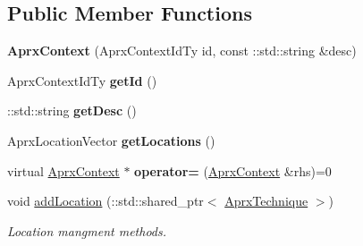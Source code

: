 \subsection*{Public Member Functions}
\begin{DoxyCompactItemize}
\item 
\hypertarget{classbellerophon_1_1core_1_1AprxContext_a1311e2eae37a05fbb1c3afa166773ff7}{}\label{classbellerophon_1_1core_1_1AprxContext_a1311e2eae37a05fbb1c3afa166773ff7} 
{\bfseries Aprx\+Context} (Aprx\+Context\+Id\+Ty id, const \+::std\+::string \&desc)
\item 
\hypertarget{classbellerophon_1_1core_1_1AprxContext_a6e7500fec23c749aa7bed069443df135}{}\label{classbellerophon_1_1core_1_1AprxContext_a6e7500fec23c749aa7bed069443df135} 
Aprx\+Context\+Id\+Ty {\bfseries get\+Id} ()
\item 
\hypertarget{classbellerophon_1_1core_1_1AprxContext_a5da690361ab4810a2c27c7b733d513c3}{}\label{classbellerophon_1_1core_1_1AprxContext_a5da690361ab4810a2c27c7b733d513c3} 
\+::std\+::string {\bfseries get\+Desc} ()
\item 
\hypertarget{classbellerophon_1_1core_1_1AprxContext_a6d2fd57fea2a507cf0865f616516ea92}{}\label{classbellerophon_1_1core_1_1AprxContext_a6d2fd57fea2a507cf0865f616516ea92} 
Aprx\+Location\+Vector {\bfseries get\+Locations} ()
\item 
\hypertarget{classbellerophon_1_1core_1_1AprxContext_a9f5def40651b564a7d1fd71b85b7a03e}{}\label{classbellerophon_1_1core_1_1AprxContext_a9f5def40651b564a7d1fd71b85b7a03e} 
virtual \hyperlink{classbellerophon_1_1core_1_1AprxContext}{Aprx\+Context} $\ast$ {\bfseries operator=} (\hyperlink{classbellerophon_1_1core_1_1AprxContext}{Aprx\+Context} \&rhs)=0
\item 
\hypertarget{classbellerophon_1_1core_1_1AprxContext_aef2bb67ec7ac79c3f3a19f21d130ab17}{}\label{classbellerophon_1_1core_1_1AprxContext_aef2bb67ec7ac79c3f3a19f21d130ab17} 
void \hyperlink{classbellerophon_1_1core_1_1AprxContext_aef2bb67ec7ac79c3f3a19f21d130ab17}{add\+Location} (\+::std\+::shared\+\_\+ptr$<$ \hyperlink{classbellerophon_1_1core_1_1AprxTechnique}{Aprx\+Technique} $>$)
\begin{DoxyCompactList}\small\item\em Location mangment methods. \end{DoxyCompactList}\item 
\hypertarget{classbellerophon_1_1core_1_1AprxContext_a3376ace3532c7bb928eefd8d3220e1b4}{}\label{classbellerophon_1_1core_1_1AprxContext_a3376ace3532c7bb928eefd8d3220e1b4} 

\end{DoxyCompactItemize}
